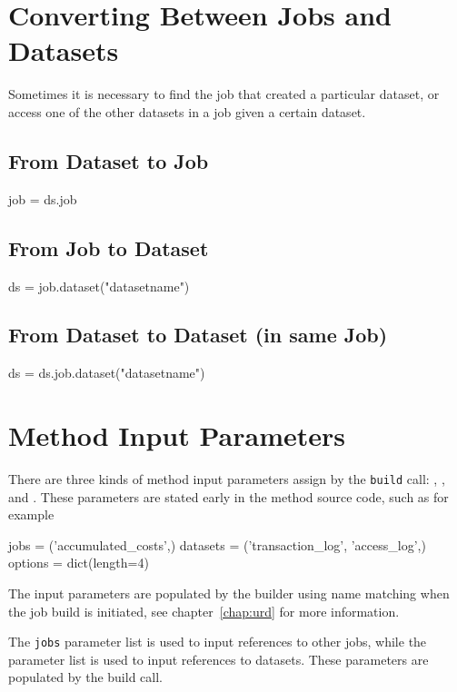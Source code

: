 \section{Converting Between Jobs and Datasets}
Sometimes it is necessary to find the job that created a particular
dataset, or access one of the other datasets in a job given a certain
dataset.


\subsection{From Dataset to Job}
\begin{python}
  job = ds.job
\end{python}


\subsection{From Job to Dataset}
\begin{python}
  ds = job.dataset("datasetname")
\end{python}


\subsection{From Dataset to Dataset (in same Job)}
\begin{python}
  ds = ds.job.dataset("datasetname")
\end{python}




\section{Method Input Parameters}
\label{sec:input_params}

There are three kinds of method input parameters assign by
the \texttt{build} call: \jobs, \datasets, and \options.  These
parameters are stated early in the method source code, such as for
example
\begin{python}
jobs = ('accumulated_costs',)
datasets = ('transaction_log', 'access_log',)
options = dict(length=4)
\end{python}
The input parameters are populated by the builder using name matching
when the job build is initiated, see chapter~\ref{chap:urd} for more
information.

The \texttt{jobs} parameter list is used to input references to other
jobs, while the \datasets parameter list is used to input references
to datasets.  These parameters are populated by the build call.

